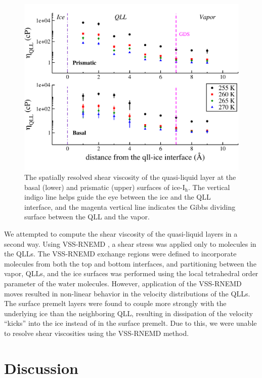 \begin{figure}
\includegraphics[width=\linewidth]{Figures/qllEta}
\caption{\label{fig:qllEta}The spatially resolved shear viscosity of
  the quasi-liquid layer at the basal (lower) and prismatic (upper)
  surfaces of ice-I$_\mathrm{h}$. The vertical indigo line helps guide
  the eye between the ice and the QLL interface, and the magenta
  vertical line indicates the Gibbs dividing surface between the QLL
  and the vapor.}
\end{figure} 

We attempted to compute the shear viscosity of the quasi-liquid layers
in a second way. Using VSS-RNEMD \cite{Kuang2012}, a shear stress was
applied only to molecules in the QLLs. The VSS-RNEMD exchange regions
were defined to incorporate molecules from both the top and bottom
interfaces, and partitioning between the vapor, QLLs, and the ice
surfaces was performed using the local tetrahedral order parameter of
the water molecules. However, application of the VSS-RNEMD moves
resulted in non-linear behavior in the velocity distributions of the
QLLs. The surface premelt layers were found to couple more strongly with the
underlying ice than the neighboring QLL, resulting in dissipation of
the velocity ``kicks'' into the ice instead of in the surface
premelt. Due to this, we were unable to resolve shear viscosities
using the VSS-RNEMD method.



\section{Discussion}

